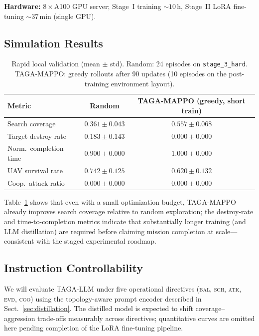 \textbf{Hardware:} $8\!\times\!$A100 GPU server; Stage~I training ${\sim}10$\,h,
Stage~II LoRA fine-tuning ${\sim}37$\,min (single GPU).

\subsection{Simulation Results}

\begin{table}[t]
\centering
\caption{Rapid local validation (mean $\pm$ std).  Random: 24 episodes on
\texttt{stage\_3\_hard}.  TAGA-MAPPO: greedy rollouts after 90 updates
(10 episodes on the post-training environment layout).}
\label{tab:sanity}
\begin{tabular}{lcc}
\toprule
Metric & Random & TAGA-MAPPO (greedy, short train) \\
\midrule
Search coverage      & $0.361 \pm 0.043$ & $0.557 \pm 0.068$ \\
Target destroy rate  & $0.183 \pm 0.143$ & $0.000 \pm 0.000$ \\
Norm.\ completion time & $0.900 \pm 0.000$ & $1.000 \pm 0.000$ \\
UAV survival rate    & $0.742 \pm 0.125$ & $0.620 \pm 0.132$ \\
Coop.\ attack ratio  & $0.000 \pm 0.000$ & $0.000 \pm 0.000$ \\
\bottomrule
\end{tabular}
\end{table}

Table~\ref{tab:sanity} shows that even with a small optimization budget,
TAGA-MAPPO already improves search coverage relative to random exploration;
the destroy-rate and time-to-completion metrics indicate that substantially
longer training (and LLM distillation) are required before claiming mission
completion at scale---consistent with the staged experimental roadmap.

\subsection{Instruction Controllability}

We will evaluate TAGA-LLM under five operational directives
(\textsc{bal}, \textsc{sch}, \textsc{atk}, \textsc{evd}, \textsc{coo}) using
the topology-aware prompt encoder described in Sect.~\ref{sec:distillation}.
The distilled model is expected to shift coverage--aggression trade-offs
measurably across directives; quantitative curves are omitted here pending
completion of the LoRA fine-tuning pipeline.

